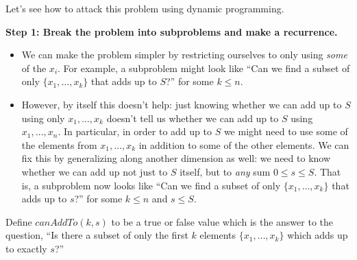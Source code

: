 \documentclass{tufte-handout}
\begin{document}
Let's see how to attack this problem using dynamic programming.

\noindent
\textbf{Step 1: Break the problem into subproblems and make a
  recurrence.}

\begin{itemize}
\item We can make the problem simpler by restricting ourselves to only
  using \emph{some} of the $x_i$.  For example, a subproblem might
  look like ``Can we find a subset of only $\{x_1, \dots, x_k\}$ that
  adds up to $S$?'' for some $k \leq n$.
\item However, by itself this doesn't help: just knowing whether we
  can add up to $S$ using only $x_1, \dots, x_k$ doesn't tell us
  whether we can add up to $S$ using $x_1, \dots, x_n$.  In
  particular, in order to add up to $S$ we might need to use some of
  the elements from $x_1, \dots, x_k$ in addition to some of the other
  elements.  We can fix this by generalizing along another dimension
  as well: we need to know whether we can add up not just to $S$
  itself, but to \emph{any} sum $0 \leq s \leq S$.  That is, a
  subproblem now looks like ``Can we find a subset of only $\{x_1,
  \dots, x_k\}$ that adds up to $s$?'' for some $k \leq n$ and $s \leq S$.
\end{itemize}

\newcommand{\canAddTo}{\mathit{canAddTo}}

Define $\canAddTo(k,s)$ to be a true or false value which is the
answer to the question, ``Is there a subset of only the first $k$
elements $\{x_1, \dots, x_k\}$ which adds up to exactly $s$?''
\end{document}
